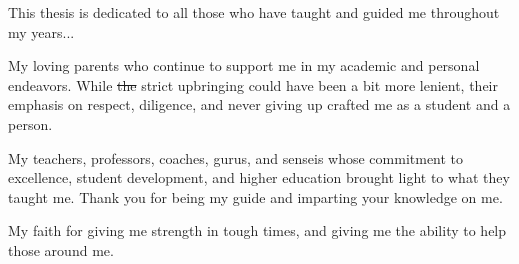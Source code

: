 \documentclass[12pt,american]{report}
\providecommand{\DIFaddtex}[1]{{\protect\color{blue}\uwave{#1}}} %
\providecommand{\DIFdeltex}[1]{{\protect\color{red}\sout{#1}}}                      %
\providecommand{\DIFaddbegin}{} %
\providecommand{\DIFaddend}{} %
\providecommand{\DIFdelbegin}{} %
\providecommand{\DIFdelend}{} %
\providecommand{\DIFadd}[1]{\texorpdfstring{\DIFaddtex{#1}}{#1}} %
\providecommand{\DIFdel}[1]{\texorpdfstring{\DIFdeltex{#1}}{}} %
\newcommand{\DIFscaledelfig}{0.5}
\newlength{\DIFdelgraphicswidth} %
\newlength{\DIFdelgraphicsheight} %
\newcommand{\DIFaddincludegraphics}[2][]{{\color{blue}\fbox{\DIFOincludegraphics[#1]{#2}}}} %
\newcommand{\DIFdelincludegraphics}[2][]{%
\sbox{\DIFdelgraphicsbox}{\DIFOincludegraphics[#1]{#2}}%
\settoboxwidth{\DIFdelgraphicswidth}{\DIFdelgraphicsbox} %
\settoboxtotalheight{\DIFdelgraphicsheight}{\DIFdelgraphicsbox} %
\scalebox{\DIFscaledelfig}{%
\parbox[b]{\DIFdelgraphicswidth}{\usebox{\DIFdelgraphicsbox}\\[-\baselineskip] \rule{\DIFdelgraphicswidth}{0em}}\llap{\resizebox{\DIFdelgraphicswidth}{\DIFdelgraphicsheight}{%
\setlength{\unitlength}{\DIFdelgraphicswidth}%
\begin{picture}(1,1)%
\thicklines\linethickness{2pt} %
{\color[rgb]{1,0,0}\put(0,0){\framebox(1,1){}}}%
{\color[rgb]{1,0,0}\put(0,0){\line( 1,1){1}}}%
{\color[rgb]{1,0,0}\put(0,1){\line(1,-1){1}}}%
\end{picture}%
}\hspace*{3pt}}} %
} %
\DeclareRobustCommand{\DIFaddbegin}{\DIFOaddbegin \let\includegraphics\DIFaddincludegraphics} %
\DeclareRobustCommand{\DIFaddend}{\DIFOaddend \let\includegraphics\DIFOincludegraphics} %
\DeclareRobustCommand{\DIFdelbegin}{\DIFOdelbegin \let\includegraphics\DIFdelincludegraphics} %
\DeclareRobustCommand{\DIFdelend}{\DIFOaddend \let\includegraphics\DIFOincludegraphics} %
\begin{document}
\copyrightfalse%
{}

\beforepreface%

\vfill
\begin{center}
This thesis is dedicated to all those who have taught and guided me throughout my years... 


My loving parents who continue to support me in my academic and personal endeavors.  While \DIFdelbegin \DIFdel{the }\DIFdelend \DIFaddbegin \DIFadd{their }\DIFaddend strict upbringing could have been a bit more lenient, their emphasis on respect, diligence, and never giving up crafted me as a student and a person.  


My teachers, professors, coaches, gurus, and senseis whose commitment to excellence, student development, and higher education brought light to what they taught me.  Thank you for being my guide and imparting your knowledge on me.


My faith for giving me strength in tough times, and giving me the ability to help those around me.
\end{center}
\vfill
\end{document}
